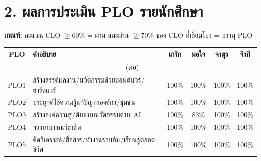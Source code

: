 \documentclass[12pt,a4paper]{article}
\begin{document}
\section*{2. ผลการประเมิน PLO รายนักศึกษา}
\textbf{เกณฑ์:} คะแนน CLO $\geq 60\%$ = ผ่าน และผ่าน $\geq 70\%$ ของ CLO ที่เชื่อมโยง = บรรลุ PLO\\[4pt]
\begin{longtable}{|c|p{6.2cm}|c|c|c|c|}
\hline
\rowcolor{hdr}\color{white}\textbf{PLO} & \color{white}\textbf{คำอธิบาย} & \color{white}\textbf{เกริก} & \color{white}\textbf{พอใจ} & \color{white}\textbf{จาตุร} & \color{white}\textbf{จิรกิ} \\ \hline
\endfirsthead \multicolumn{6}{c}{\tablename\ (ต่อ)} \\ \hline \endhead
  PLO1 & สร้างสรรค์ผลงาน/นวัตกรรมด้วยซอฟต์แวร์/ฮาร์ดแวร์ & \cellcolor{pass}100\% & \cellcolor{pass}100\% & \cellcolor{pass}100\% & \cellcolor{pass}100\% \\ \hline
  PLO2 & ประยุกต์ใช้ความรู้แก้ปัญหาองค์กร/ชุมชน & \cellcolor{pass}100\% & \cellcolor{pass}100\% & \cellcolor{pass}100\% & \cellcolor{pass}100\% \\ \hline
  PLO3 & สร้างองค์ความรู้/ต้นแบบนวัตกรรมด้าน AI & \cellcolor{pass}100\% & \cellcolor{pass}83\% & \cellcolor{pass}100\% & \cellcolor{pass}100\% \\ \hline
  PLO4 & จรรยาบรรณวิชาชีพ & \cellcolor{pass}100\% & \cellcolor{pass}100\% & \cellcolor{pass}100\% & \cellcolor{pass}100\% \\ \hline
  PLO5 & คิดวิเคราะห์/สื่อสาร/ทำงานร่วมกัน/เรียนรู้ตลอดชีวิต & \cellcolor{pass}100\% & \cellcolor{pass}100\% & \cellcolor{pass}100\% & \cellcolor{pass}100\% \\ \hline
\end{longtable}
\end{document}
